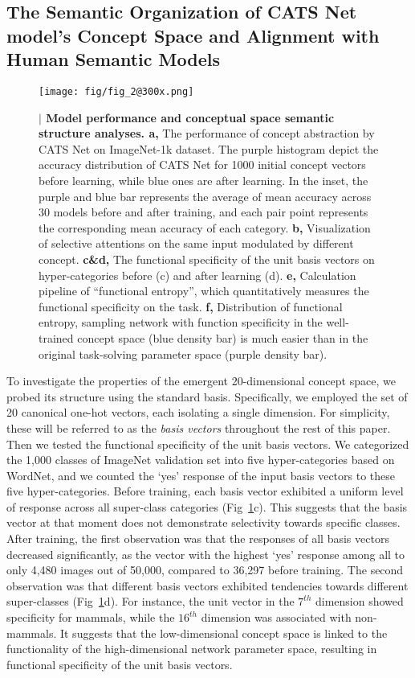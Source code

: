 \documentclass[pdflatex,sn-mathphys-num,lineno]{sn-jnl}%
\begin{document}
\begin{CJK}{UTF8}{gbsn}
\subsection{The Semantic Organization of CATS Net model’s Concept Space and Alignment with Human Semantic Models}\label{subsec_space_prop} 

\begin{figure}[htbp]
\centering
\texttt{[image: fig/fig\_2@300x.png]}
\caption{\textbf{$\vert$ Model performance and conceptual space semantic structure analyses. a,} The performance of concept abstraction by CATS Net on ImageNet-1k dataset. The purple histogram depict the accuracy distribution of CATS Net for 1000 initial concept vectors before learning, while blue ones are after learning.  In the inset,  the purple and blue bar represents the average of mean accuracy across 30 models before and after training, and each pair point represents the corresponding mean accuracy of each category. \textbf{b,} Visualization of selective attentions on the same input modulated by different concept. \textbf{c\&d,} The functional specificity of the unit basis vectors on hyper-categories before (c) and after learning (d). \textbf{e,} Calculation pipeline of “functional entropy”, which quantitatively measures the functional specificity on the task. \textbf{f,} Distribution of functional entropy, sampling network with function specificity in the well-trained concept space (blue density bar) is much easier than in the original task-solving parameter space (purple density bar).}
\label{fig2}
\end{figure}

To investigate the properties of the emergent 20-dimensional concept space, we probed its structure using the standard basis. Specifically, we employed the set of 20 canonical one-hot vectors, each isolating a single dimension. For simplicity, these will be referred to as the \textit{basis vectors} throughout the rest of this paper. Then we tested the functional specificity of the unit basis vectors. We categorized the 1,000 classes of ImageNet validation set into five hyper-categories based on WordNet, and we counted the ‘yes’ response of the input basis vectors to these five hyper-categories. Before training, each basis vector exhibited a uniform level of response across all super-class categories (Fig~\ref{fig2}c). This suggests that the basis vector at that moment does not demonstrate selectivity towards specific classes. After training, the first observation was that the responses of all basis vectors decreased significantly, as the vector with the highest ‘yes’ response among all to only 4,480 images out of 50,000, compared to 36,297 before training. The second observation was that different basis vectors exhibited tendencies towards different super-classes (Fig~\ref{fig2}d). For instance, the unit vector in the $7^{th}$ dimension showed specificity for mammals, while the $16^{th}$ dimension was associated with non-mammals. It suggests that the low-dimensional concept space is linked to the functionality of the high-dimensional network parameter space, resulting in functional specificity of the unit basis vectors. 


\end{CJK}
\end{document}
